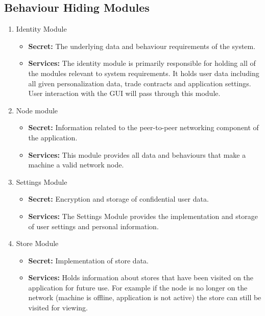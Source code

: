 \documentclass{article}
\begin{document}
\subsection{Behaviour Hiding Modules}
\begin{enumerate}
\item
Identity Module
\begin{itemize}
\item
\textbf{Secret:} The underlying data and behaviour requirements of the system.

\item
\textbf{Services:} The identity module is primarily responsible for holding all of the modules relevant to system requirements. It holds user data including all given personalization data, trade contracts and application settings. User interaction with the GUI will pass through this module.
\end{itemize}

\item
Node module
\begin{itemize}
\item
\textbf{Secret:} Information related to the peer-to-peer networking component of the application.

\item
\textbf{Services:} This module provides all data and behaviours that make a machine a valid network node.
\end{itemize}



\item
Settings Module
\begin{itemize}
\item
\textbf{Secret:} Encryption and storage of confidential user data.

\item
\textbf{Services:} The Settings Module provides the implementation and storage of user settings and personal information.
\end{itemize}

\item
Store Module
\begin{itemize}
\item
\textbf{Secret:} Implementation of store data.

\item
\textbf{Services:} Holds information about stores that have been visited on the application for future use. For example if the node is no longer on the network (machine is offline, application is not active) the store can still be visited for viewing.
\end{itemize}


\end{enumerate}
\end{document}
